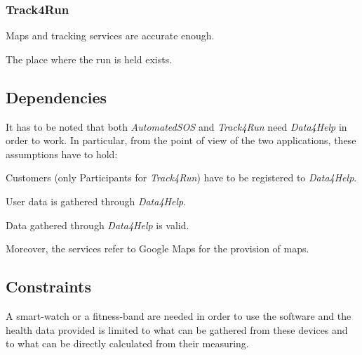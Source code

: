             \subsubsection{Track4Run}
                \begin{enumerate}[label={[}D3.\arabic*{]}, leftmargin=*]
                    \item Maps and tracking services are accurate enough.
                    
                    \item The place where the run is held exists.
                \end{enumerate}
                
    \subsection{Dependencies}
        It has to be noted that both \emph{AutomatedSOS} and \emph{Track4Run} need \emph{Data4Help} in order to work. In particular, from the point of view of the two applications, these assumptions have to hold:
        \begin{enumerate}[label={[}D2-3.\arabic*{]}, leftmargin=*]
            \item Customers (only Participants for \emph{Track4Run}) have to be registered to \emph{Data4Help}.
            
            \item User data is gathered through \emph{Data4Help}.
            
            \item Data gathered through \emph{Data4Help} is valid. \\
        \end{enumerate}
        Moreover, the services refer to Google Maps for the provision of maps.
        
    \subsection{Constraints}
        A smart-watch or a fitness-band are needed in order to use the software and the health data provided is limited to what can be gathered from these devices and to what can be directly calculated from their measuring.
